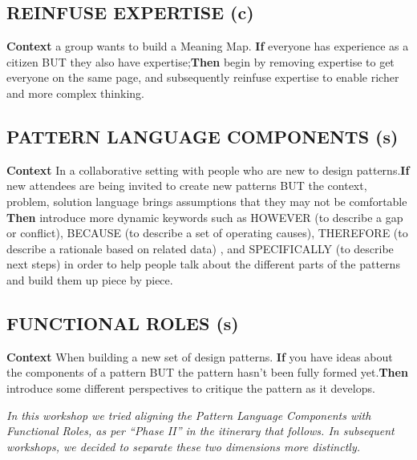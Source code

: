 \documentclass[acmlarge,timestamp]{acmart}
\newcommand{\sensory}{(s)}
\newcommand{\cognitive}{(c)}
\begin{document}
\subsection*{REINFUSE EXPERTISE {\hfill \cognitive}}

\textbf{Context} a group wants to build a {\sc Meaning Map}.\newline
\textbf{If} everyone has experience as a citizen BUT they also have
expertise;\newline \textbf{Then} begin by removing expertise to get
everyone on the same page, and subsequently reinfuse expertise to
enable richer and more complex thinking.\newline\smallskip

\subsection*{PATTERN LANGUAGE COMPONENTS {\hfill \sensory}}

\textbf{Context} In a collaborative setting with people who are new to
design patterns.\newline \textbf{If} new attendees are being invited
to create new patterns BUT the context, problem, solution language
brings assumptions that they may not be comfortable \newline \textbf{Then}
introduce more dynamic keywords such as HOWEVER (to describe a gap or
conflict), BECAUSE (to describe a set of operating causes), THEREFORE
(to describe a rationale based on related data) , and SPECIFICALLY (to
describe next steps) in order to help people talk about the different parts
of the patterns and build them up piece by piece.

\subsection*{FUNCTIONAL ROLES {\hfill \sensory}}

\textbf{Context} When building a new set of design patterns.\newline
\textbf{If} you have ideas about the components of a pattern BUT the
pattern hasn’t been fully formed yet.\newline \textbf{Then} introduce
some different perspectives to critique the pattern as it
develops.

\emph{In this workshop we tried aligning the {\sc Pattern Language
  Components} with {\sc Functional Roles}, as per “Phase II” in the
itinerary that follows.  In subsequent workshops, we decided to
separate these two dimensions more distinctly.}
\end{document}
